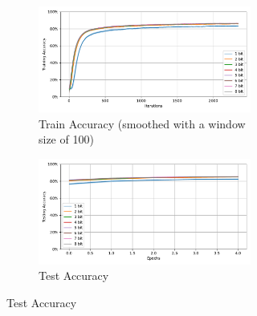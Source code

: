         \begin{figure}[H]
            \centering
            \begin{subfigure}[H]{0.69\textwidth}
                \centering
                \begin{subfigure}[H]{\textwidth}
                    \centering
                    \includegraphics[width=\textwidth]{../standard/FashionMNIST/plots/fashionmnist_train_acc.pdf}
                    \caption{Train Accuracy (smoothed with a window size of 100)}
                \end{subfigure}
                \hfill
                \begin{subfigure}[H]{\textwidth}
                    \centering
                    \includegraphics[width=\textwidth]{../standard/FashionMNIST/plots/fashionmnist_test_acc.pdf}
                    \caption{Test Accuracy}
                \end{subfigure}
            \end{subfigure}
            \hfill
            \begin{subfigure}[H]{0.3\textwidth}
                \centering

\end{subfigure}
\end{figure}
